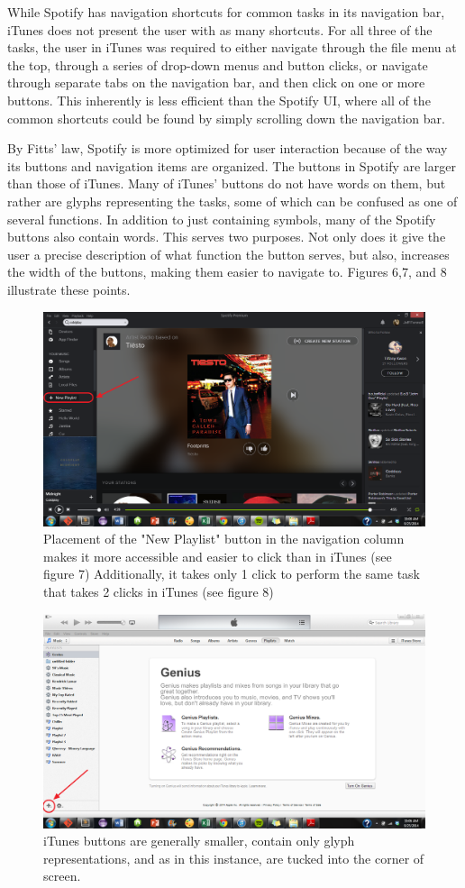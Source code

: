 \documentclass[12pt]{report}
\begin{document}
While Spotify has navigation shortcuts for common tasks in its 
navigation bar, iTunes does not present the user with as many 
shortcuts. For all three of the tasks, the user in iTunes was 
required to either navigate through the file menu at the top, 
through a series of drop-down menus and button clicks, or navigate 
through separate tabs on the navigation bar, and then click on one 
or more buttons. This inherently is less efficient than the 
Spotify UI, where all of the common shortcuts could be found by 
simply scrolling down the navigation bar. 

By Fitts' law, Spotify is more optimized for user interaction 
because of the way its buttons and navigation items are organized. 
The buttons in Spotify are larger than those of iTunes. Many of 
iTunes' buttons do not have words on them, but rather are glyphs 
representing the tasks, some of which can be confused as one of 
several functions. In addition to just containing symbols, many of 
the Spotify buttons also contain words. This serves two purposes. 
Not only does it give the user a precise description of what 
function the button serves, but also, increases the width of the 
buttons, making them easier to navigate to. Figures 6,7, and 8 
illustrate these points.

\begin{figure}[H]
	\centering
	\includegraphics[width=.75\textwidth]{chart8.png}
	\caption{Placement of the "New Playlist" button in the 
navigation column makes it more accessible and easier to click 
than in iTunes (see figure 7) Additionally, it takes only 1 click 
to perform the same task that takes 2 clicks in iTunes (see figure 
8)}
\end{figure}

\begin{figure}[H]
	\centering
	\includegraphics[width=.75\textwidth]{chart7.png}
	\caption{iTunes buttons are generally smaller, contain 
only glyph representations, and as in this instance, are tucked 
into the corner of screen.}
\end{figure}
\end{document}
